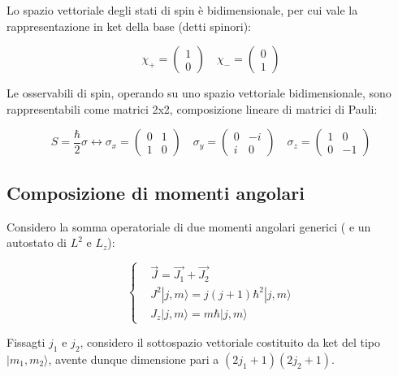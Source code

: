 \documentclass{report}
\begin{document}
Lo spazio vettoriale degli stati di spin è bidimensionale, per cui vale la rappresentazione in ket della base (detti spinori):

\begin{equation}
  \chi_+=\begin{pmatrix}
    1 \\
    0
  \end{pmatrix}
  \quad
  \chi_-=\begin{pmatrix}
    0 \\
    1
  \end{pmatrix}
\end{equation}

Le osservabili di spin, operando su uno spazio vettoriale bidimensionale, sono rappresentabili come matrici 2x2, composizione lineare di matrici di Pauli:

\begin{equation}
  S=\frac{\hbar}{2}\sigma \leftrightarrow
  \sigma_x=\begin{pmatrix}
    0 & 1 \\
    1 & 0
  \end{pmatrix}
  \quad
  \sigma_y=\begin{pmatrix}
    0 & -i \\
    i & 0
  \end{pmatrix}
  \quad
  \sigma_z=\begin{pmatrix}
    1 & 0  \\
    0 & -1
  \end{pmatrix}
\end{equation}

\subsection{Composizione di momenti angolari}

Considero la somma operatoriale di due momenti angolari generici ( e un autostato di $L^2$ e $L_z$):

\begin{equation}
  \left\{
  \begin{aligned}
     & \vec{J}=\vec{J_1}+\vec{J_2}              \\
     & J^2|j,m\rangle =j(j+1)\hbar^2|j,m\rangle \\
     & J_z|j,m\rangle =m\hbar|j,m\rangle
  \end{aligned}
  \right.
\end{equation}

Fissagti $j_1$ e $j_2$, considero il sottospazio vettoriale costituito da ket del tipo $|m_1,m_2\rangle $, avente dunque dimensione pari a $(2j_1+1)(2j_2+1)$.
\end{document}
